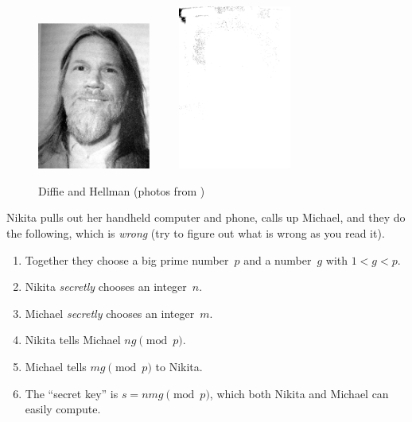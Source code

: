 \begin{figure}
\begin{center}
\includegraphics[width=10em]{graphics/diffie}
$\qquad$
\includegraphics[width=10em]{graphics/hellman}
\end{center}
\caption{Diffie and Hellman (photos from
\cite{singh:crypto})}
\end{figure}



Nikita pulls out her handheld computer and phone,
calls up Michael, and they do the following, which
is {\em wrong} (try to figure out what is wrong as
you read it).
\begin{enumerate}
\item Together they choose a big prime number~$p$ and a number~$g$ with
$1<g<p$.
\item Nikita {\em secretly} chooses an integer~$n$.
\item Michael {\em secretly} chooses an integer~$m$.
\item Nikita tells Michael $ng \pmod{p}$.
\item Michael tells $mg\pmod{p}$ to Nikita.
\item The ``secret key'' is
$s=nmg\pmod{p}$,
which both Nikita and Michael can easily compute.
\end{enumerate}


